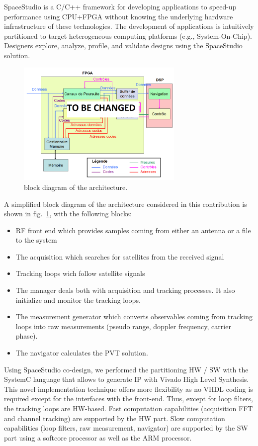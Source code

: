 \documentclass[conference]{IEEEtran}
\begin{document}
SpaceStudio is a C/C++ framework for developing applications to speed-up performance using CPU+FPGA without knowing the underlying hardware infrastructure of these technologies. The development of applications is intuitively partitioned to target heterogeneous computing platforms (e.g., System-On-Chip). Designers explore, analyze, profile, and validate designs using the SpaceStudio solution. 
\begin{figure}[!ht]
\centerline{\includegraphics[width=8cm]{figs/Synoptique.png}}
\caption{block diagram of the architecture.}
\label{fig:BlockDiag}
\end{figure}
A simplified block diagram of the architecture considered in this contribution is shown in fig.~\ref{fig:BlockDiag}, with the following blocks:
\begin{itemize}
\item RF front end which provides samples coming from either an antenna or a file to the system
\item The acquisition which searches for satellites from the received signal
\item Tracking loops wich follow satellite signals
\item The manager deals both with acquisition and tracking processes. It also initialize and monitor the tracking loops.
\item The measurement generator which converts observables coming from tracking loops into raw measurements (pseudo range, doppler frequency, carrier phase).
\item The navigator calculates the PVT solution.
\end{itemize}  
Using SpaceStudio co-design, we performed the partitioning HW / SW with the SystemC language that allows to generate IP with Vivado High Level Synthesis. This novel implementation technique offers more flexibility as no VHDL coding is required except for the interfaces with the front-end. Thus, except for loop filters, the tracking loops are HW-based. Fast computation capabilities (acquisition FFT and channel tracking) are supported by the HW part. Slow computation capabilities (loop filters, raw measurement, navigator) are supported by the SW part using a softcore processor as well as the ARM processor. 
\end{document}
